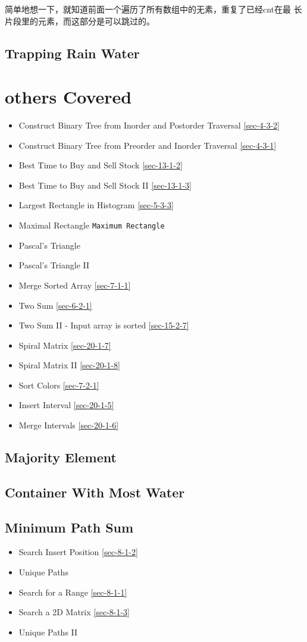 \documentclass[12pt]{book}
\begin{document}
简单地想一下，就知道前面一个遍历了所有数组中的无素，重复了已经cnt在最
长片段里的元素，而这部分是可以跳过的。

\subsection{Trapping Rain Water}
\label{sec-1-3-4}
\section{others Covered}
\label{sec-1-4}
\begin{itemize}
\item Construct Binary Tree from Inorder and Postorder Traversal
\ref{sec-4-3-2}
\item Construct Binary Tree from Preorder and Inorder Traversal
\ref{sec-4-3-1}
\item Best Time to Buy and Sell Stock
\ref{sec-13-1-2}
\item Best Time to Buy and Sell Stock II        
\ref{sec-13-1-3}
\item Largest Rectangle in Histogram
\ref{sec-5-3-3}
\item Maximal Rectangle
\texttt{Maximum Rectangle}
\item Pascal's Triangle
\item Pascal's Triangle II
\item Merge Sorted Array        
\ref{sec-7-1-1}
\item Two Sum
\ref{sec-6-2-1}
\item Two Sum II - Input array is sorted
\ref{sec-15-2-7}
\item Spiral Matrix
\ref{sec-20-1-7}
\item Spiral Matrix II
\ref{sec-20-1-8}
\item Sort Colors
\ref{sec-7-2-1}
\item Insert Interval
\ref{sec-20-1-5}
\item Merge Intervals
\ref{sec-20-1-6}
\end{itemize}
\subsection{Majority Element}
\label{sec-1-4-1}
\subsection{Container With Most Water}
\label{sec-1-4-2}
\subsection{Minimum Path Sum}
\label{sec-1-4-3}
\begin{itemize}
\item Search Insert Position
\ref{sec-8-1-2}
\item Unique Paths
\item Search for a Range
\ref{sec-8-1-1}
\item Search a 2D Matrix
\ref{sec-8-1-3}
\item Unique Paths II
\end{itemize}
\end{document}
